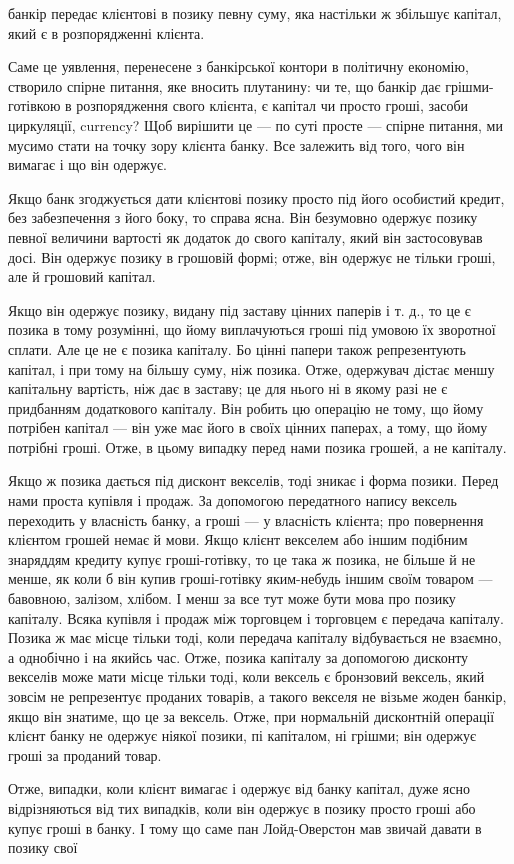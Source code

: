 \parcont{}  %
банкір передає клієнтові в позику певну суму, яка настільки ж
збільшує капітал, який є в розпорядженні клієнта.

Саме це уявлення, перенесене з банкірської контори в політичну економію, створило спірне питання,
яке вносить плутанину: чи те, що банкір дає грішми-готівкою в розпорядження
свого клієнта, є капітал чи просто гроші, засоби циркуляції,
currency? Щоб вирішити це — по суті просте — спірне питання,
ми мусимо стати на точку зору клієнта банку. Все залежить
від того, чого він вимагає і що він одержує.

Якщо банк згоджується дати клієнтові позику просто під
його особистий кредит, без забезпечення з його боку, то справа
ясна. Він безумовно одержує позику певної величини вартості
як додаток до свого капіталу, який він застосовував досі. Він
одержує позику в грошовій формі; отже, він одержує не тільки
гроші, але й грошовий капітал.

Якщо він одержує позику, видану під заставу цінних паперів і т. д., то це є позика в тому розумінні,
що йому виплачуються гроші під умовою їх зворотної сплати. Але це не є
позика капіталу. Бо цінні папери також репрезентують капітал,
і при тому на більшу суму, ніж позика. Отже, одержувач дістає меншу капітальну вартість, ніж дає в
заставу; це для нього
ні в якому разі не є придбанням додаткового капіталу. Він робить цю операцію не тому, що йому
потрібен капітал — він уже
має його в своїх цінних паперах, а тому, що йому потрібні гроші.
Отже, в цьому випадку перед нами позика грошей, а не капіталу.

Якщо ж позика дається під дисконт векселів, тоді зникає і форма
позики. Перед нами проста купівля і продаж. За допомогою передатного напису вексель переходить у
власність банку, а гроші — у власність клієнта; про повернення клієнтом грошей немає й мови. Якщо
клієнт векселем або іншим подібним знаряддям
кредиту купує гроші-готівку, то це така ж позика, не більше
й не менше, як коли б він купив гроші-готівку яким-небудь
іншим своїм товаром — бавовною, залізом, хлібом. І менш за
все тут може бути мова про позику капіталу. Всяка купівля і продаж між торговцем і торговцем є
передача капіталу.
Позика ж має місце тільки тоді, коли передача капіталу відбувається не взаємно, а однобічно і на
якийсь час. Отже, позика
капіталу за допомогою дисконту векселів може мати місце
тільки тоді, коли вексель є бронзовий вексель, який зовсім не
репрезентує проданих товарів, а такого векселя не візьме жоден
банкір, якщо він знатиме, що це за вексель. Отже, при нормальній дисконтній операції клієнт банку не
одержує ніякої позики,
пі капіталом, ні грішми; він одержує гроші за проданий товар.

Отже, випадки, коли клієнт вимагає і одержує від банку
капітал, дуже ясно відрізняються від тих випадків, коли він
одержує в позику просто гроші або купує гроші в банку. І тому
що саме пан Лойд-Оверстон мав звичай давати в позику свої
\parbreak{}  %
